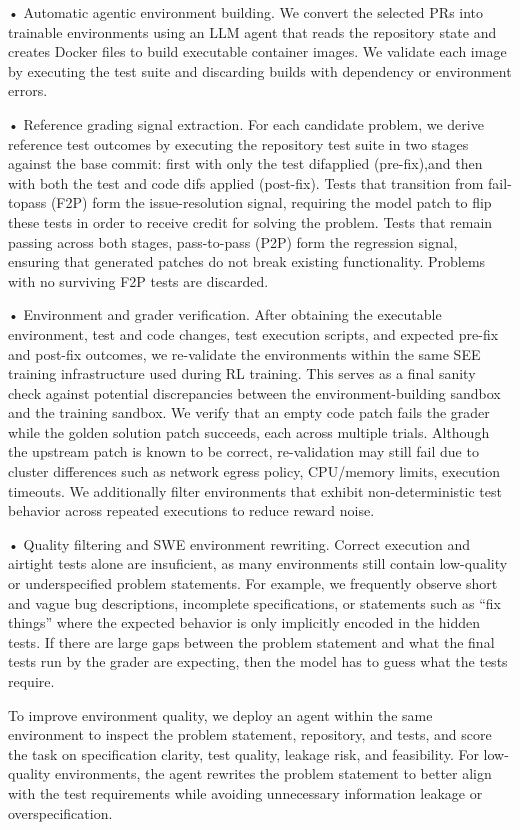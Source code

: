 \documentclass[
  10
]{article}
\begin{document}
• Automatic agentic environment building. We convert the selected PRs
into trainable environments using an LLM agent that reads the repository
state and creates Docker files to build executable container images. We
validate each image by executing the test suite and discarding builds
with dependency or environment errors.

• Reference grading signal extraction. For each candidate problem, we
derive reference test outcomes by executing the repository test suite in
two stages against the base commit: first with only the test difapplied
(pre-fix),and then with both the test and code difs applied (post-fix).
Tests that transition from fail-topass (F2P) form the issue-resolution
signal, requiring the model patch to flip these tests in order to
receive credit for solving the problem. Tests that remain passing across
both stages, pass-to-pass (P2P) form the regression signal, ensuring
that generated patches do not break existing functionality. Problems
with no surviving F2P tests are discarded.

• Environment and grader verification. After obtaining the executable
environment, test and code changes, test execution scripts, and expected
pre-fix and post-fix outcomes, we re-validate the environments within
the same SEE training infrastructure used during RL training. This
serves as a final sanity check against potential discrepancies between
the environment-building sandbox and the training sandbox. We verify
that an empty code patch fails the grader while the golden solution
patch succeeds, each across multiple trials. Although the upstream patch
is known to be correct, re-validation may still fail due to cluster
differences such as network egress policy, CPU/memory limits, execution
timeouts. We additionally filter environments that exhibit
non-deterministic test behavior across repeated executions to reduce
reward noise.

• Quality filtering and SWE environment rewriting. Correct execution and
airtight tests alone are insuficient, as many environments still contain
low-quality or underspecified problem statements. For example, we
frequently observe short and vague bug descriptions, incomplete
specifications, or statements such as ``fix things'' where the expected
behavior is only implicitly encoded in the hidden tests. If there are
large gaps between the problem statement and what the final tests run by
the grader are expecting, then the model has to guess what the tests
require.

To improve environment quality, we deploy an agent within the same
environment to inspect the problem statement, repository, and tests, and
score the task on specification clarity, test quality, leakage risk, and
feasibility. For low-quality environments, the agent rewrites the
problem statement to better align with the test requirements while
avoiding unnecessary information leakage or overspecification.
\end{document}
